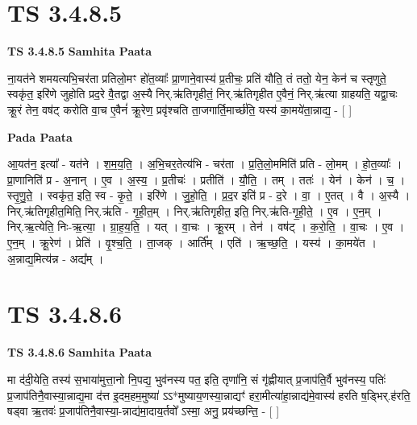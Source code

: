 \documentclass[17pt]{extarticle}
\begin{document}

\section{ TS 3.4.8.5 }

\textbf{TS 3.4.8.5 } \newline
\textbf{Samhita Paata} \newline

ना॒यत॑ने शमयत्यभि॒चर॑ता प्रतिलो॒मꣳ हो॑त॒व्याः᳚ प्रा॒णाने॒वास्य॑ प्र॒तीचः॒ प्रति॑ यौति॒ तं ततो॒ येन॒ केन॑ च स्तृणुते॒ स्वकृ॑त॒ इरि॑णे जुहोति प्रद॒रे वै॒तद्वा अ॒स्यै निर्.ऋ॑तिगृहीतं॒ निर्.ऋ॑तिगृहीत ए॒वैनं॒ निर्.ऋ॑त्या ग्राहयति॒ यद्वा॒चः क्रू॒रं तेन॒ वष॑ट् करोति वा॒च ए॒वैनं॑ क्रू॒रेण॒ प्रवृ॑श्चति ता॒जगार्ति॒मार्च्छ॑ति॒ यस्य॑ का॒मये॑ता॒न्नाद्य॒ - [  ] \newline

\textbf{Pada Paata} \newline

आ॒यत॑न॒ इत्या᳚ - यत॑ने । श॒म॒य॒ति॒ । अ॒भि॒चर॒तेत्य॑भि - चर॑ता । प्र॒ति॒लो॒ममिति॑ प्रति - लो॒मम् । हो॒त॒व्याः᳚ । प्रा॒णानिति॑ प्र - अ॒नान् । ए॒व । अ॒स्य॒ । प्र॒तीचः॑ । प्रतीति॑ । यौ॒ति॒ । तम् । ततः॑ । येन॑ । केन॑ । च॒ । स्तृ॒णु॒ते॒ । स्वकृ॑त॒ इति॒ स्व - कृ॒ते॒ । इरि॑णे । जु॒हो॒ति॒ । प्र॒द॒र इति॑ प्र - द॒रे । वा॒ । ए॒तत् । वै । अ॒स्यै । निर्.ऋ॑तिगृहीत॒मिति॒ निर्.ऋ॑ति - गृ॒ही॒त॒म् । निर्.ऋ॑तिगृहीत॒ इति॒ निर्.ऋ॑ति-गृ॒ही॒ते॒ । ए॒व । ए॒न॒म् । निर्.ऋ॒त्येति॒ निः-ऋ॒त्या॒ । ग्रा॒ह॒य॒ति॒ । यत् । वा॒चः । क्रू॒रम् । तेन॑ । वष॑ट् । क॒रो॒ति॒ । वा॒चः । ए॒व । ए॒न॒म् । क्रू॒रेण॑ । प्रेति॑ । वृ॒श्च॒ति॒ । ता॒जक् । आर्ति᳚म् । एति॑ । ऋ॒च्छ॒ति॒ । यस्य॑ । का॒मये॑त । अ॒न्नाद्य॒मित्य॑न्न - अद्य᳚म् ।  \newline





\section{ TS 3.4.8.6 }

\textbf{TS 3.4.8.6 } \newline
\textbf{Samhita Paata} \newline

मा द॑दी॒येति॒ तस्य॑ स॒भाया॑मुत्ता॒नो नि॒पद्य॒ भुव॑नस्य पत॒ इति॒ तृणा॑नि॒ सं गृ॑ह्णीयात् प्र॒जाप॑ति॒र्वै भुव॑नस्य॒ पतिः॑ प्र॒जाप॑तिनै॒वास्या॒न्नाद्य॒मा द॑त्त इ॒दम॒हम॒मुष्या॑ ऽऽ*मुष्याय॒णस्या॒न्नाद्यꣳ॑ हरा॒मीत्या॑हा॒न्नाद्य॑मे॒वास्य॑ हरति ष॒ड्भिर्.ह॑रति॒ षड्वा ऋ॒तवः॑ प्र॒जाप॑तिनै॒वास्या॒-न्नाद्य॑मा॒दाय॒र्तवो᳚ ऽस्मा॒ अनु॒ प्रय॑च्छन्ति॒ - [  ] \newline
\end{document}

